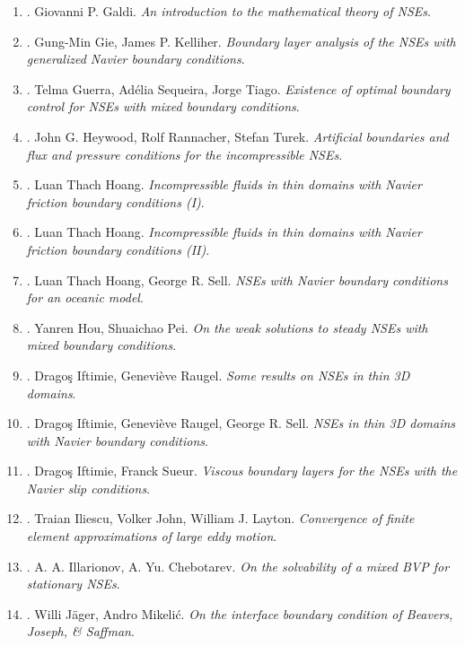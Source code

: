 \documentclass{article}
\begin{document}
\begin{enumerate}
	\item \cite{Galdi2011}. {\sc Giovanni P. Galdi}. {\it An introduction to the mathematical theory of NSEs}.
	\item \cite{Gie_Kelliher2012}. {\sc Gung-Min Gie, James P. Kelliher}. {\it Boundary layer analysis of the NSEs with generalized Navier boundary conditions}.
	\item \cite{Guerra_Sequeira2015}. {\sc Telma Guerra,  Ad\'{e}lia Sequeira, Jorge Tiago}. {\it Existence of optimal boundary control for NSEs with mixed boundary conditions}.
	\item \cite{Heywood_Rannacher_Turek1996}. {\sc John G. Heywood, Rolf Rannacher, Stefan Turek}. {\it Artificial boundaries and flux and pressure conditions for the incompressible NSEs}.
	\item \cite{Hoang2010}. {\sc Luan Thach Hoang}. {\it Incompressible fluids in thin domains with Navier friction boundary conditions (I)}.
	\item \cite{Hoang2013}. {\sc Luan Thach Hoang}. {\it Incompressible fluids in thin domains with Navier friction boundary conditions (II)}.
	\item \cite{Hoang_Sell2010}. {\sc Luan Thach Hoang, George R. Sell}. {\it NSEs with Navier boundary conditions for an oceanic model}.
	\item \cite{Hou_Pei2019}. {\sc Yanren Hou, Shuaichao Pei}. {\it On the weak solutions to steady NSEs with mixed boundary conditions}.
	\item \cite{Iftimie_Raugel2001}. {\sc Drago\c{s} Iftimie, Genevi\`eve Raugel}. {\it Some results on NSEs in thin 3D domains}.
	\item \cite{Iftimie_Raugel_Sell2007}. {\sc Drago\c{s} Iftimie, Genevi\`eve Raugel, George R. Sell}. {\it NSEs in thin 3D domains with Navier boundary conditions}.
	\item \cite{Iftimie_Sueur2011}. {\sc Drago\c{s} Iftimie, Franck Sueur}. {\it Viscous boundary layers for the NSEs with the Navier slip conditions}.
	\item \cite{Iliescu_John_Layton2002}. {\sc Traian Iliescu, Volker John, William J. Layton}. {\it Convergence of finite element approximations of large eddy motion}.
	\item \cite{Illarionov_Chebotarev2001}. {\sc A. A. Illarionov, A. Yu. Chebotarev}. {\it On the solvability of a mixed BVP for stationary NSEs}.
	\item \cite{Jager_Mikelic2000}. {\sc Willi J\"{a}ger, Andro Mikeli\'{c}}. {\it On the interface boundary condition of Beavers, Joseph, \& Saffman}.

\end{enumerate}
\end{document}
